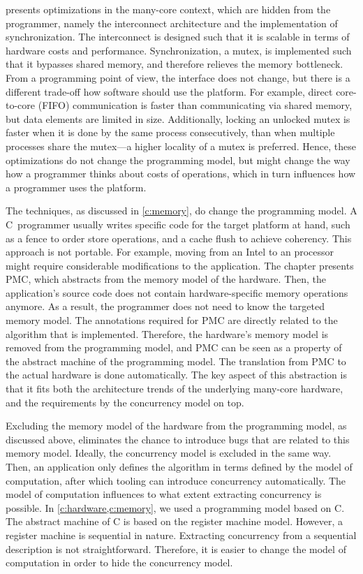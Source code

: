  presents optimizations in the many-core context, which are hidden from the programmer, namely the interconnect architecture and the implementation of synchronization.
The interconnect is designed such that it is scalable in terms of hardware costs and performance.
Synchronization, \ie a mutex, is implemented such that it bypasses shared memory, and therefore relieves the memory bottleneck.
From a programming point of view, the interface does not change, but there is a different trade-off how software should use the platform.
For example, direct core-to-core (\ac{FIFO}) communication is faster than communicating via shared memory, but data elements are limited in size.
Additionally, locking an unlocked mutex is faster when it is done by the same process consecutively, than when multiple processes share the mutex---a higher locality of a mutex is preferred.
Hence, these optimizations do not change the programming model, but might change the way how a programmer thinks about costs of operations, which in turn influences how a programmer uses the platform.


The techniques, as discussed in \cref{c:memory}, do change the programming model.
A C~programmer usually writes specific code for the target platform at hand, such as a fence to order store operations, and a cache flush to achieve coherency.
This approach is not portable.
For example, moving from an Intel to an  processor might require considerable modifications to the application.
The chapter presents \ac{PMC}, which abstracts from the memory model of the hardware.
Then, the application's source code does not contain hardware-specific memory operations anymore.
As a result, the programmer does not need to know the targeted memory model.
The annotations required for \ac{PMC} are directly related to the algorithm that is implemented.
Therefore, the hardware's memory model is removed from the programming model, and \ac{PMC} can be seen as a property of the abstract machine of the programming model.
The translation from \ac{PMC} to the actual hardware is done automatically.
The key aspect of this abstraction is that it fits both the architecture trends of the underlying many-core hardware, and the requirements by the concurrency model on top.

Excluding the memory model of the hardware from the programming model, as discussed above, eliminates the chance to introduce bugs that are related to this memory model.
Ideally, the concurrency model is excluded in the same way.
Then, an application only defines the algorithm in terms defined by the model of computation, after which tooling can introduce concurrency automatically.
The model of computation influences to what extent extracting concurrency is possible.
In \cref{c:hardware,c:memory}, we used a programming model based on C.
The abstract machine of C is based on the register machine model.
However, a register machine is sequential in nature.
Extracting concurrency from a sequential description is not straightforward.
Therefore, it is easier to change the model of computation in order to hide the concurrency model.

